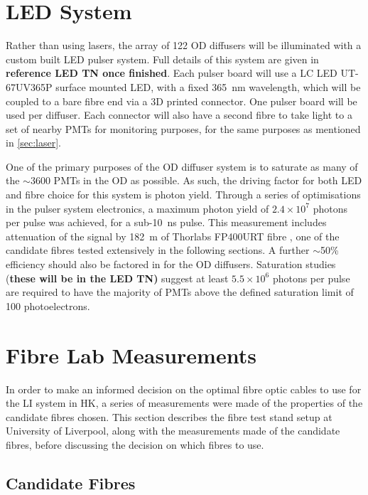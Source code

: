 \documentclass[a4paper,11pt]{article}
\let\oldsim\sim
\renewcommand{\sim}{{\oldsim}}
\begin{document}
\section{LED System}\label{sec:LED}
Rather than using lasers, the array of 122 OD diffusers will be illuminated with a custom built LED pulser system. Full details of this system are given in {\bf reference LED TN once finished}. Each pulser board will use a LC LED UT-67UV365P \cite{bib:LCLED} surface mounted LED, with a fixed 365~nm wavelength, which will be coupled to a bare fibre end via a 3D printed connector. One pulser board will be used per diffuser. Each connector will also have a second fibre to take light to a set of nearby PMTs for monitoring purposes, for the same purposes as mentioned in \cref{sec:laser}.

One of the primary purposes of the OD diffuser system is to saturate as many of the $\sim3600$ PMTs in the OD as possible. As such, the driving factor for both LED and fibre choice for this system is photon yield. Through a series of optimisations in the pulser system electronics, a maximum photon yield of $2.4\times10^{7}$ photons per pulse was achieved, for a sub-10~ns pulse. This measurement includes attenuation of the signal by 182~m of Thorlabs FP400URT fibre \cite{bib:fp400urt}, one of the candidate fibres tested extensively in the following sections. A further $\sim$50\% efficiency should also be factored in for the OD diffusers. Saturation studies ({\bf these will be in the LED TN)} suggest at least $5.5\times10^6$ photons per pulse are required to have the majority of PMTs above the defined saturation limit of 100 photoelectrons. 


\section{Fibre Lab Measurements}

In order to make an informed decision on the optimal fibre optic cables to use for the LI system in HK, a series of measurements were made of the properties of the candidate fibres chosen. This section describes the fibre test stand setup at University of Liverpool, along with the measurements made of the candidate fibres, before discussing the decision on which fibres to use.

\subsection{Candidate Fibres}
\end{document}
